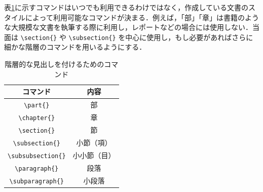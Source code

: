 表\ref{table:section}に示すコマンドはいつでも利用できるわけではなく，作成している文書のスタイルによって利用可能なコマンドが決まる．例えば，「部」「章」は書籍のような大規模な文書を執筆する際に利用し，レポートなどの場合には使用しない．当面は \verb|\section{}| や \verb|\subsection{}| を中心に使用し，もし必要があればさらに細かな階層のコマンドを用いるようにする．

\begin{table}[t]
    \caption{階層的な見出しを付けるためのコマンド}
    \label{table:section}
    \centering
    \begin{tabular}{c|c}
        コマンド & 内容　\\ \hline
        \verb|\part{}| & 部 \\
        \verb|\chapter{}| & 章 \\
        \verb|\section{}| & 節 \\
        \verb|\subsection{}| & 小節（項）\\
        \verb|\subsubsection{}| & 小小節（目）\\
        \verb|\paragraph{}| & 段落\\
        \verb|\subparagraph{}| & 小段落\\
    \end{tabular}
\end{table}


